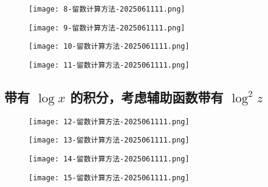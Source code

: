 \begin{figure}[H]
\centering
\texttt{[image: 8-留数计算方法-2025061111.png]}
\label{}
\end{figure}
\begin{figure}[H]
\centering
\texttt{[image: 9-留数计算方法-2025061111.png]}
\label{}
\end{figure}
\begin{figure}[H]
\centering
\texttt{[image: 10-留数计算方法-2025061111.png]}
\label{}
\end{figure}
\begin{figure}[H]
\centering
\texttt{[image: 11-留数计算方法-2025061111.png]}
\label{}
\end{figure}

\subsection{带有 \texorpdfstring{$\log x$}{log x} 的积分，考虑辅助函数带有 \texorpdfstring{$\log ^{2}z$}{log ^2z}}

\begin{figure}[H]
\centering
\texttt{[image: 12-留数计算方法-2025061111.png]}
\label{}
\end{figure}
\begin{figure}[H]
\centering
\texttt{[image: 13-留数计算方法-2025061111.png]}
\label{}
\end{figure}
\begin{figure}[H]
\centering
\texttt{[image: 14-留数计算方法-2025061111.png]}
\label{}
\end{figure}
\begin{figure}[H]
\centering
\texttt{[image: 15-留数计算方法-2025061111.png]}
\label{}
\end{figure}
